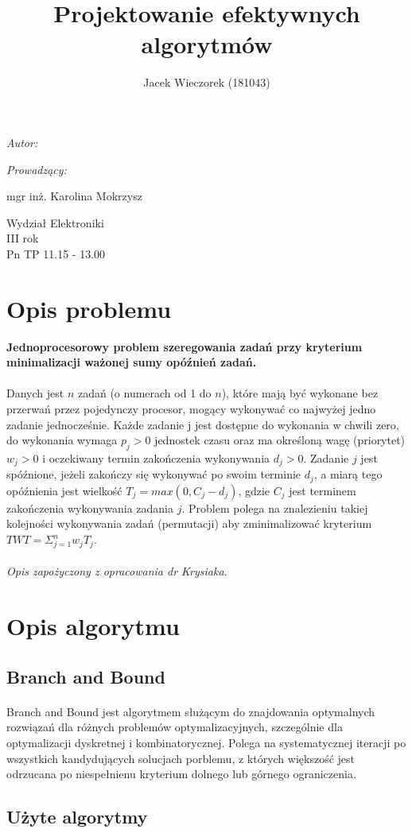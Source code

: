 \documentclass[wide,a4paper,titlepage,12pt] {article}
\title{Projektowanie efektywnych algorytmów}
\author{Jacek Wieczorek (181043)}
\makeatletter
\renewcommand{\maketitle}{
\begin{titlepage}
  \begin{center}
    \vspace*{3cm}
    \LARGE \@title \par
    \vspace{2cm}
    \textit{\small Autor:}\par
    \normalsize \@author\par \normalsize
    \vspace{3cm}
    \textit{\small Prowadzący:}\par
    mgr inż. Karolina Mokrzysz \par
    \vspace{2cm}
    Wydział Elektroniki\\ III rok\\ Pn TP 11.15 - 13.00\par
    \vspace{4cm}
    \small \@date
  \end{center}
\end{titlepage}
}
\makeatother
\begin{document}
\maketitle
  \section{Opis problemu}
{\bf Jednoprocesorowy problem szeregowania zadań przy kryterium
minimalizacji ważonej sumy opóźnień zadań.}
\paragraph{}
Danych jest $n$ zadań (o numerach od 1 do $n$), które mają być wykonane bez przerwań przez pojedynczy procesor, mogący wykonywać co najwyżej jedno zadanie jednocześnie.
Każde zadanie j jest dostępne do wykonania w chwili zero, do wykonania wymaga $p_{j} > 0$ jednostek czasu oraz ma określoną wagę (priorytet) $w_{j} > 0$ i oczekiwany termin zakończenia
wykonywania $d_{j} > 0$. Zadanie $j$ jest spóźnione, jeżeli zakończy się wykonywać po swoim terminie $d_{j}$, a miarą tego opóźnienia jest wielkość $T_{j} = max(0, C_{j} - d_{j} )$, gdzie $C_{j}$ jest terminem zakończenia
wykonywania zadania $j$. Problem polega na znalezieniu takiej kolejności wykonywania zadań (permutacji) aby zminimalizować kryterium $TWT = \Sigma_{j=1}^{n} w_{j} T_{j}$. \\\\
{\it *Opis zapożyczony z opracowania dr Krysiaka.}

\section{Opis algorytmu}
\subsection{Branch and Bound}
\paragraph{}
Branch and Bound jest algorytmem służącym do znajdowania optymalnych rozwiązań dla różnych problemów optymalizacyjnych, szczególnie dla optymalizacji dyskretnej i kombinatorycznej. Polega na systematycznej iteracji po wszystkich kandydujących solucjach porblemu, z których większość jest odrzucana po niespełnienu kryterium dolnego lub górnego ograniczenia.
\subsection{Użyte algorytmy}
\end{document}
